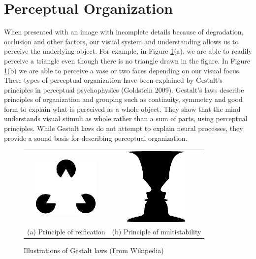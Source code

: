\section*{Perceptual Organization}

When presented with an image with incomplete details because of degradation, occlusion and other factors, our visual system and understanding allows us to perceive the underlying object. For example, in Figure \ref{fig1}(a), we are able to readily perceive a triangle even though there is no triangle drawn in the figure. In Figure \ref{fig1}(b) we are able to perceive a vase or two faces depending on our visual focus. These types of perceptual organization have been explained by Gestalt’s principles in perceptual psychophysics (Goldstein 2009). Gestalt’s laws describe principles of organization and grouping such as continuity, symmetry and good form to explain what is perceived as a whole object. They show that the mind understands visual stimuli as whole rather than a sum of parts, using perceptual principles. While Gestalt laws do not attempt to explain neural processes, they provide a sound basis for describing perceptual organization. 

\begin{figure}[H]
\centering

\begin{tabular}[t]{cc}
\includegraphics[scale=1.3]{figures/1.eps} & \includegraphics{figures/2.eps}\\[5pt]
(a) Principle of reification & (b) Principle of multistability
\end{tabular}

\caption{Illustrations of Gestalt laws (From Wikipedia)}\label{fig1}
\end{figure}

